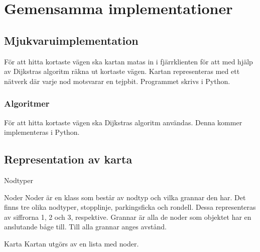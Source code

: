 \documentclass[designspec/spec.tex]{subfiles}
\begin{document}
\section{Gemensamma implementationer}

\subsection{Mjukvaruimplementation}
För att hitta kortaste vägen ska kartan matas in i fjärrklienten för att med
hjälp av Dijkstras algoritm räkna ut kortaste vägen. Kartan
representeras med ett nätverk där varje nod motsvarar en tejpbit. Programmet
skrivs i Python.

\subsubsection{Algoritmer}
För att hitta kortaste vägen ska Dijkstras algoritm användas. Denna kommer
implementeras i Python.

\subsection{Representation av karta}

\begin{labeling}{Nodtyper}

\item [Noder] 
Noder är en klass som består av nodtyp och vilka grannar den har.
Det finns tre olika nodtyper, stopplinje, parkingsficka och rondell. Dessa
representeras av siffrorna 1, 2 och 3, respektive.
Grannar är alla de noder som objektet har en anslutande båge till. Till alla
grannar anges avstånd.

\item[Karta]
Kartan utgörs av en lista med noder. 

\end{labeling}
\end{document}
